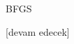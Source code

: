 \documentclass[12pt,fleqn]{article}\usepackage{../../common}
\begin{document}
BFGS 

[devam edecek]

\inputminted[fontsize=\footnotesize]{python}{bfgs4.py}
\end{document}

